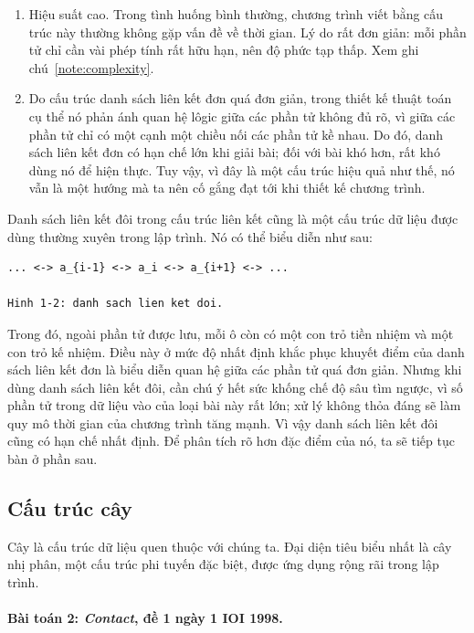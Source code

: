 \documentclass[11pt]{article}
\begin{document}
\begin{enumerate}
  \item Hiệu suất cao. Trong tình huống bình thường, chương trình viết bằng
  cấu trúc này thường không gặp vấn đề về thời gian. Lý do rất đơn giản: mỗi
  phần tử chỉ cần vài phép tính rất hữu hạn, nên độ phức tạp thấp. Xem ghi
  chú~\ref{note:complexity}.
  \item Do cấu trúc danh sách liên kết đơn quá đơn giản, trong thiết kế thuật
  toán cụ thể nó phản ánh quan hệ lôgic giữa các phần tử không đủ rõ, vì giữa
  các phần tử chỉ có một cạnh một chiều nối các phần tử kề nhau. Do đó, danh
  sách liên kết đơn có hạn chế lớn khi giải bài; đối với bài khó hơn, rất
  khó dùng nó để hiện thực. Tuy vậy, vì đây là một cấu trúc hiệu quả như thế,
  nó vẫn là một hướng mà ta nên cố gắng đạt tới khi thiết kế chương trình.
\end{enumerate}

Danh sách liên kết đôi trong cấu trúc liên kết cũng là một cấu trúc dữ liệu
được dùng thường xuyên trong lập trình. Nó có thể biểu diễn như sau:

\begin{verbatim}
... <-> a_{i-1} <-> a_i <-> a_{i+1} <-> ...

Hinh 1-2: danh sach lien ket doi.
\end{verbatim}

Trong đó, ngoài phần tử được lưu, mỗi ô còn có một con trỏ tiền nhiệm và một
con trỏ kế nhiệm. Điều này ở mức độ nhất định khắc phục khuyết điểm của danh
sách liên kết đơn là biểu diễn quan hệ giữa các phần tử quá đơn giản. Nhưng
khi dùng danh sách liên kết đôi, cần chú ý hết sức khống chế độ sâu tìm ngược,
vì số phần tử trong dữ liệu vào của loại bài này rất lớn; xử lý không thỏa
đáng sẽ làm quy mô thời gian của chương trình tăng mạnh. Vì vậy danh sách
liên kết đôi cũng có hạn chế nhất định. Để phân tích rõ hơn đặc điểm của nó,
ta sẽ tiếp tục bàn ở phần sau.

\subsection{Cấu trúc cây}

Cây là cấu trúc dữ liệu quen thuộc với chúng ta. Đại diện tiêu biểu nhất là
cây nhị phân, một cấu trúc phi tuyến đặc biệt, được ứng dụng rộng rãi trong
lập trình.

\paragraph{Bài toán 2: \textit{Contact}, đề 1 ngày 1 IOI 1998.}
\end{document}
